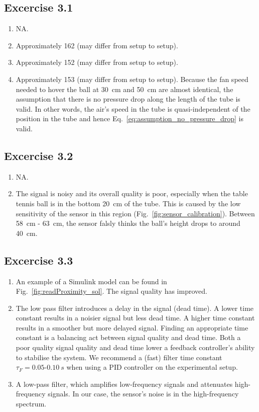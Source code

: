 \documentclass[10pt,twoside,openright]{article}
\begin{document}
\subsection*{Excercise 3.1}

\begin{enumerate}
\setlength\itemsep{0em}
	\item NA.
	\item Approximately 162 (may differ from setup to setup).
	\item Approximately 152 (may differ from setup to setup).
	\item Approximately 153 (may differ from setup to setup). Because the fan speed needed to hover the ball at 30~cm and 50~cm are almost identical, the assumption that there is no pressure drop along the length of the tube is valid. In other words, the air's speed in the tube is quasi-independent of the position in the tube and hence Eq.~\ref{eq:assumption_no_pressure_drop} is valid.
\end{enumerate}

\subsection*{Excercise 3.2}

\begin{enumerate}
\setlength\itemsep{0em}
\item NA.
\item The signal is noisy and its overall quality is poor, especially when the table tennis ball is in the bottom 20~cm of the tube. This is caused by the low sensitivity of the sensor in this region (Fig.~\ref{fig:sensor_calibration}). Between 58~cm - 63~cm, the sensor falsly thinks the ball's height drops to around 40~cm.
\end{enumerate}

\subsection*{Excercise 3.3}

\begin{enumerate}
\setlength\itemsep{0em}
\item An example of a Simulink model can be found in Fig.~\ref{fig:readProximity_sol}. The signal quality has improved.
\item The low pass filter introduces a delay in the signal (dead time). A lower time constant results in a noisier signal but less dead time. A higher time constant results in a smoother but more delayed signal. Finding an appropriate time constant is a balancing act between signal quality and dead time. Both a poor quality signal quality and dead time lower a feedback controller's ability to stabilise the system. We recommend a (fast) filter time constant $\tau_F = 0.05\text{-}0.10~s$ when using a PID controller on the experimental setup.
\item A low-pass filter, which amplifies low-frequency signals and attenuates high-frequency signals. In our case, the sensor's noise is in the high-frequency spectrum. 
\end{enumerate}
\end{document}
